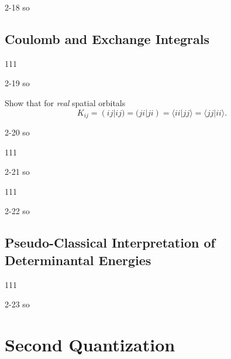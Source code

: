 \documentclass[a4paper]{book}
\begin{document}
	\begin{solution}
		2-18 so
	\end{solution}
	
	\subsection{Coulomb and Exchange Integrals}

	\begin{exercise}
	111
	\end{exercise}
	
	\begin{solution}
		2-19 so
	\end{solution}
	
	\begin{exercise}
	Show that for {\it real} spatial orbitals
	\[
		K_{ij} = (ij|ij) = (ji|ji) = \langle ii | jj \rangle = \langle jj | ii \rangle.
	\]
	\end{exercise}
	
	\begin{solution}
		2-20 so
	\end{solution}
	
	\begin{exercise}
	111
	\end{exercise}
	
	\begin{solution}
		2-21 so
	\end{solution}
	
	\begin{exercise}
	111
	\end{exercise}
	
	\begin{solution}
		2-22 so
	\end{solution}
	
	\subsection{Pseudo-Classical Interpretation of Determinantal Energies}
	
	\begin{exercise}
	111
	\end{exercise}
	
	\begin{solution}
		2-23 so
	\end{solution}
	
	\section{Second Quantization}
	
\end{document}

